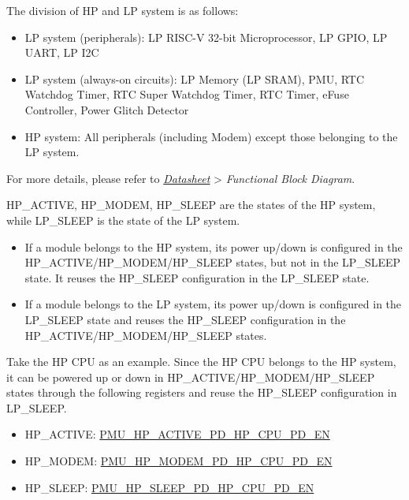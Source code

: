 \documentclass[main\_\_EN.tex]{subfiles}
\begin{document}
\begin{tiplisting}
    The division of HP and LP system is as follows:
    \begin{itemize}
    \item LP system (peripherals): LP RISC-V 32-bit Microprocessor, LP GPIO, LP UART, LP I2C
    \item LP system (always-on circuits): LP Memory (LP SRAM), PMU, RTC Watchdog Timer, RTC Super Watchdog Timer, RTC Timer, eFuse Controller, Power Glitch Detector
    \item HP system: All peripherals (including Modem) except those belonging to the LP system.
    \end{itemize}

For more details, please refer to \href{https://www.espressif.com/sites/default/files/documentation/esp32-c5_datasheet_en.pdf}{\textit{\chipname{} Datasheet}} > \textit{Functional Block Diagram}.


\end{tiplisting}

HP\_ACTIVE, HP\_MODEM, HP\_SLEEP are the states of the HP system, while LP\_SLEEP is the state of the LP system.

\begin{itemize}
    \item If a module belongs to the HP system, its power up/down is configured in the HP\_ACTIVE/HP\_MODEM/HP\_SLEEP states, but not in the LP\_SLEEP state. It reuses the HP\_SLEEP configuration in the LP\_SLEEP state.
    \item If a module belongs to the LP system, its power up/down is configured in the LP\_SLEEP state and reuses the HP\_SLEEP configuration in the HP\_ACTIVE/HP\_MODEM/HP\_SLEEP states.
\end{itemize}

Take the HP CPU as an example. Since the HP CPU belongs to the HP system, it can be powered up or down in HP\_ACTIVE/HP\_MODEM/HP\_SLEEP states through the following registers and reuse the HP\_SLEEP configuration in LP\_SLEEP.

\begin{itemize}
    \item HP\_ACTIVE: \hyperref[fielddesc:PMUHPACTIVEPDHPCPUPDEN]{PMU\_HP\_ACTIVE\_PD\_HP\_CPU\_PD\_EN}
    \item HP\_MODEM: \hyperref[fielddesc:PMUHPMODEMPDHPCPUPDEN]{PMU\_HP\_MODEM\_PD\_HP\_CPU\_PD\_EN}
    \item HP\_SLEEP: \hyperref[fielddesc:PMUHPSLEEPPDHPCPUPDEN]{PMU\_HP\_SLEEP\_PD\_HP\_CPU\_PD\_EN}
\end{itemize}
\end{document}
